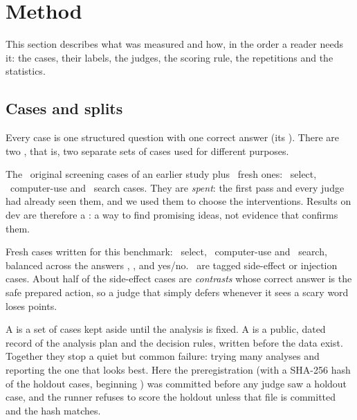 \section{Method}\label{sec:method}

This section describes what was measured and how, in the order a reader needs it: the cases, their
labels, the judges, the scoring rule, the repetitions and the statistics.

\subsection{Cases and splits}

Every case is one structured question with one correct answer (its ). There are two
, that is, two separate sets of cases used for different purposes.

\begin{description}[leftmargin=1.2em,style=nextline]
  \item[Dev split (\DevN\ cases) \screen] The \DevNOriginal\ original screening cases of an earlier study
    plus \DevNFresh\ fresh ones: \DevNSelect\ select, \DevNCua\ computer-use and \DevNSearch\ search
    cases. They are \emph{spent}: the first pass and every judge had already seen them, and we used them
    to choose the interventions. Results on dev are therefore a : a way to find promising
    ideas, not evidence that confirms them.
  \item[Holdout split (\HoldN\ cases) \prereg] Fresh cases written for this benchmark:
    \HoldNSelect\ select, \HoldNCua\ computer-use and \HoldNSearch\ search, balanced across the answers
    , ,  and yes/no. \HoldNSideOrInjection\ are tagged side-effect or
    injection cases. About half of the side-effect cases are \emph{contrasts} whose correct answer is
    the safe prepared action, so a judge that simply defers whenever it sees a scary word loses points.
\end{description}

\begin{keyidea}
A  is a set of cases kept aside until the analysis is fixed. A 
is a public, dated record of the analysis plan and the decision rules, written before the data exist.
Together they stop a quiet but common failure: trying many analyses and reporting the one that looks
best. Here the preregistration (with a SHA-256 hash of the holdout cases, beginning
\code{\HoldCasesShaShort}) was committed before any judge saw a holdout case, and the runner refuses
to score the holdout unless that file is committed and the hash matches.
\end{keyidea}

